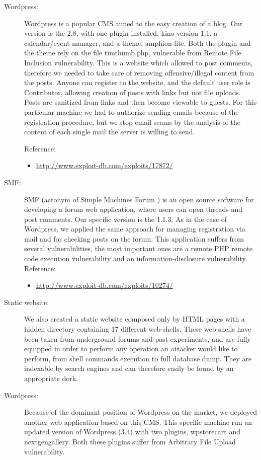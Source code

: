 \begin{description}
\item[Wordpress: ] Wordpress \cite{wordpress} is a popular CMS aimed to the easy creation of a blog. Our version is the 2.8, with one plugin installed, kino version 1.1, a calendar/event manager, and a theme, amphion-lite. Both the plugin and the theme rely on the file timthumb.php, vulnerable from Remote File Inclusion vulnerability. This is a website which allowed to post comments, therefore we needed to take care of removing offensive/illegal content from the posts. Anyone can register to the website, and the default user role is Contributor, allowing creation of posts with links but not file uploads. Posts are sanitized from links and then become viewable to guests. For this particular machine we had to authorize sending emails because of the registration procedure, but we stop email scams by the analysis of the content of each single mail the server is willing to send.

Reference:
\begin{itemize}
\item
\url{http://www.exploit-db.com/exploits/17872/}
\end{itemize}

\item[SMF: ] SMF (acronym of Simple Machines Forum \cite{smf}) is an open source software for developing a forum web application, where users can open threads and post comments. Our specific version is the 1.1.3. As in the case of Wordpress, we applied the same approach for managing registration via mail and for checking posts on the forum. This application suffers from several vulnerabilities, the most important ones are a remote PHP remote code execution vulnerability and an information-disclosure vulnerability.
Reference:
\begin{itemize}
\item
\url{http://www.exploit-db.com/exploits/10274/}
\end{itemize}

\item[Static website: ] We also created a static website composed only by HTML pages with a hidden directory containing 17 different web-shells. These web-shells have been taken from underground forums and past experiments, and are fully equipped in order to perform any operation an attacker would like to perform, from shell commands execution to full database dump. They are indexable by search engines and can therefore easily be found by an appropriate dork.

\item[Wordpress: ] Because of the dominant position of Wordpress on the market, we deployed another web application based on this CMS. This specific machine run an updated version of Wordpress (3.4) with two plugins, wpstorecart and nextgengallery. Both these plugins suffer from Arbitrary File Upload vulnerability.


\end{description}
